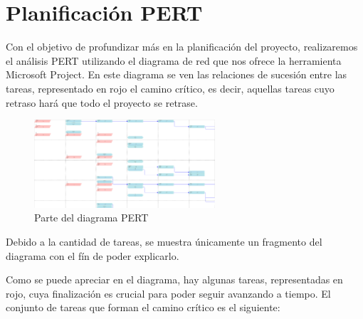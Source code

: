 \section{Planificación PERT}

\par Con el objetivo de profundizar más en la planificación del proyecto, realizaremos el análisis PERT utilizando el diagrama de red que nos ofrece la herramienta Microsoft Project. En este diagrama se ven las relaciones de sucesión entre las tareas, representado en rojo el camino crítico, es decir, aquellas tareas cuyo retraso hará que todo el proyecto se retrase.

\begin{figure}[h]
\begin{center}
\includegraphics[width=0.6\textwidth]{./img/Pert.png}
\end{center}
\caption{Parte del diagrama PERT}
\label{tab:pert}
\end{figure}

\par Debido a la cantidad de tareas, se muestra únicamente un fragmento del diagrama con el fín de poder explicarlo.

\par Como se puede apreciar en el diagrama, hay algunas tareas, representadas en rojo, cuya finalización es crucial para poder seguir avanzando a tiempo. El conjunto de tareas que forman el camino crítico es el siguiente:

